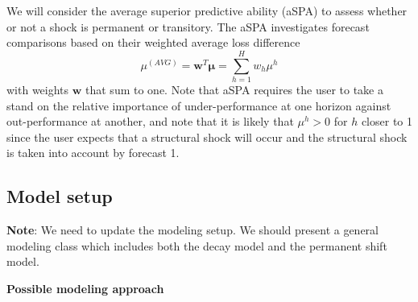 \documentclass[11pt]{article}
\theoremstyle{definition}
\begin{document}
We will consider the average superior predictive ability (aSPA) to assess whether or not a shock is permanent or transitory. The aSPA investigates forecast comparisons based on their weighted average loss difference
$$
  \mu^{(AVG)} = \textbf{w}^T\mathbf{\mu} = \sum_{h=1}^H w_h \mu^h
$$
with weights $\textbf{w}$ that sum to one. Note that aSPA requires the user to take a stand on the relative importance of under-performance at one horizon against out-performance at another, and note that it is likely that $\mu^h > 0$ for $h$ closer to 1 since the user expects that a structural shock will occur and the structural shock is taken into account by forecast 1. 





\subsection{Model setup}
\label{modelsetup}

\noindent\textbf{Note}: We need to update the modeling setup. We should present a general modeling class which includes both the decay model and the permanent shift model.

\vspace{0.5cm}\noindent\textbf{Possible modeling approach}
\end{document}
